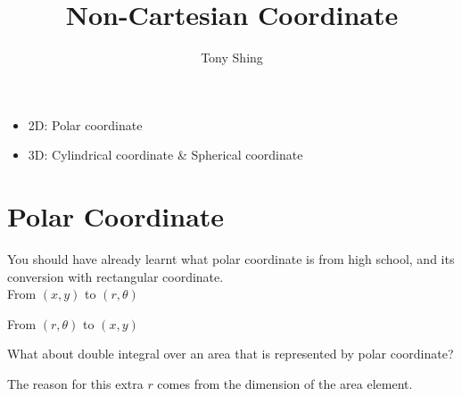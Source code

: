 \documentclass[class=article, crop=false, 12pt]{standalone}
\author{Tony Shing}
\title{Non-Cartesian Coordinate}
\begin{document}
\maketitle


\begin{overview}
    \begin{itemize}
        \item 2D: Polar coordinate
        \item 3D: Cylindrical coordinate \& Spherical coordinate
    \end{itemize}
\end{overview}



\section{Polar Coordinate}

You should have already learnt what polar coordinate is from high school,
and its conversion with rectangular coordinate. \\

From $(x,y)$ to $(r,\theta)$

From $(r,\theta)$ to $(x,y)$


What about double integral over an area that is represented by polar coordinate?
\\


The reason for this extra $r$ comes from the dimension of the area element.
\end{document}
